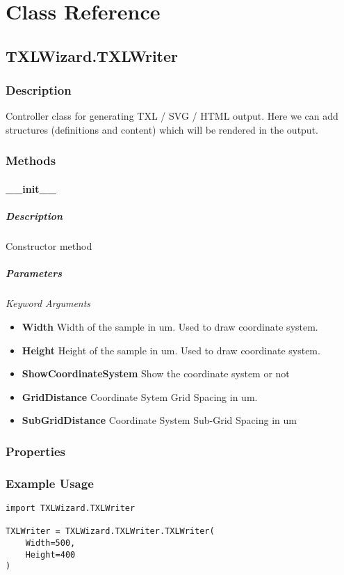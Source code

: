 \section{Class Reference}
    \subsection{TXLWizard.TXLWriter}
        \subsubsection{Description}
            Controller class for generating TXL / SVG / HTML output.
            Here we can add structures (definitions and content) which will be rendered in the output.
        \subsubsection{Methods}
            \paragraph{\_\_init\_\_}
                \subparagraph{Description} Constructor method
                \subparagraph{Parameters}\mbox \\
                    \textit{Keyword Arguments}
                    \begin{itemize}
                        \item \textbf{Width}\superscript{*}  Width of the sample in um. Used to draw coordinate system.
                        \item \textbf{Height}\superscript{*}  Height of the sample in um. Used to draw coordinate system.
                        \item \textbf{ShowCoordinateSystem}\superscript{*}  Show the coordinate system or not
                        \item \textbf{GridDistance}\superscript{*}  Coordinate Sytem Grid Spacing in um.
                        \item \textbf{SubGridDistance}\superscript{*}  Coordinate System Sub-Grid Spacing in um
                    \end{itemize}
        \subsubsection{Properties}
        \subsubsection{Example Usage}
            \begin{lstlisting}
import TXLWizard.TXLWriter

TXLWriter = TXLWizard.TXLWriter.TXLWriter(
    Width=500,
    Height=400
)
            \end{lstlisting}

